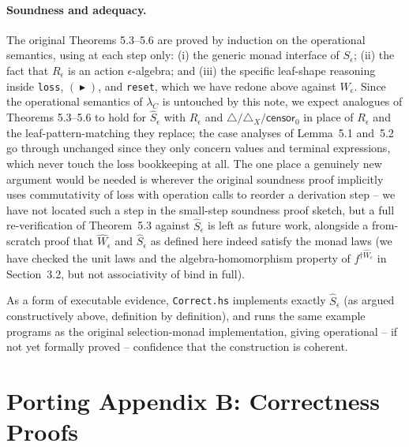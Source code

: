 \documentclass[11pt]{article}
\theoremstyle{plain}
\newcommand{\Rm}[1]{\widehat{R}_{#1}}
\newcommand{\eps}{\epsilon}
\newcommand{\dg}[1]{^{\dagger #1}}
\newcommand{\then}{\mathrel{\blacktriangleright}}
\newcommand{\censor}{\mathsf{censor}_0}
\newcommand{\collect}{\triangle}
\newcommand{\lC}{\lambda_C}
\begin{document}
\paragraph{Soundness and adequacy.} The original Theorems 5.3--5.6 are proved by induction on
the operational semantics, using at each step only: (i) the generic monad interface of
$S_\eps$; (ii) the fact that $R_\eps$ is an action $\eps$-algebra; and (iii) the specific
leaf-shape reasoning inside \texttt{loss}, $(\then)$, and \texttt{reset}, which we have redone
above against $\widehat W_\eps$. Since the operational semantics of $\lC$ is untouched by this
note, we expect analogues of Theorems 5.3--5.6 to hold for $\widehat S_\eps$ with $\Rm\eps$ and
$\collect/\collect_X/\censor$ in place of $R_\eps$ and the leaf-pattern-matching they replace;
the case analyses of Lemma~5.1 and~5.2 go through unchanged since they only concern values and
terminal expressions, which never touch the loss bookkeeping at all. The one place a genuinely
new argument would be needed is wherever the original soundness proof implicitly uses
commutativity of loss with operation calls to reorder a derivation step -- we have not located
such a step in the small-step soundness proof sketch, but a full re-verification of
Theorem~5.3 against $\widehat S_\eps$ is left as future work, alongside a from-scratch proof
that $\widehat W_\eps$ and $\widehat S_\eps$ as defined here indeed satisfy the monad laws (we
have checked the unit laws and the algebra-homomorphism property of $f\dg{\widehat W_\eps}$ in
Section~3.2, but not associativity of bind in full).

As a form of executable evidence, \texttt{Correct.hs} implements exactly $\widehat S_\eps$ (as
argued constructively above, definition by definition), and runs the same example programs as
the original selection-monad implementation, giving operational -- if not yet formally
proved -- confidence that the construction is coherent.

\section{Porting Appendix B: Correctness Proofs}
\end{document}
